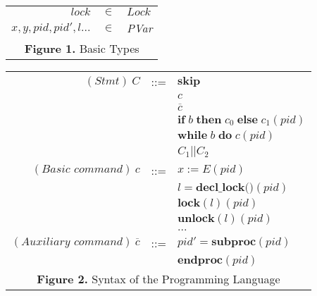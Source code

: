 \documentclass[UTF8, 8pt, a4paper ]{ctexart}
\begin{document}
\begin{small}
\begin{longtable}{rcl}
				$lock$ & $ \in $ & $Lock$ \\

				$ x, y, pid, pid', l...  $ & $ \in $ & \textit{PVar} \\ 
				\hline
				\multicolumn{3}{c}{\textbf{Figure 1.} Basic Types} \\
		\end{longtable}
				
				
		\begin{longtable}{rcl}

			\hline
				$ (\!\textit{Stmt})\ C $ & ::= & $ \textbf{skip}$\\ 
					&& $ c $\\ 
					&& $ \overline{c}  $\\
					&& $\textbf{if}\;b\;\textbf{then}\;c_0\;\textbf{else}\;c_1(pid)$\\
					&& $\textbf{while}\;b\;\textbf{do}\;c(pid)$\\
					&& $C_1 || C_2$\\ 
				
				$ (\!\textit{Basic command})\ c $ & ::= & $ x := E(pid)  $\\
					&& $l = \textbf{decl\_lock()}(pid)$\\
					&& $\textbf{lock}(l)(pid)$\\
					&& $\textbf{unlock}(l)(pid)$\\
					&& $...$\\
				
				
				
				$ (\!\textit{Auxiliary command})\ \overline{c} $ & ::= & $ pid' = \textbf{subproc}(pid) $\\ 
					&& $ \textbf{endproc}(pid)  $\\
				\hline
				
				\multicolumn{3}{c}{\textbf{Figure 2.} Syntax of the Programming Language} \\
			
		\end{longtable}
	

\end{small}
\end{document}
